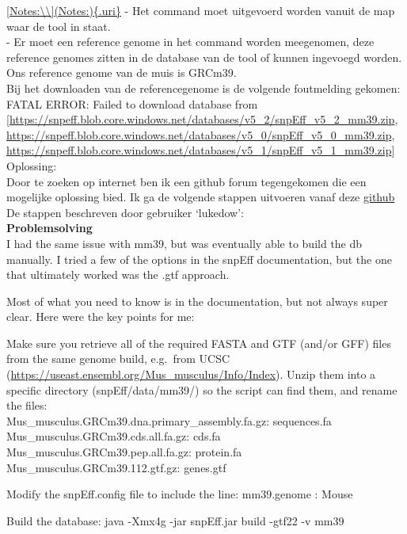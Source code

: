 \documentclass[
]{article}
\begin{document}
\href{\%5BNotes:\%5D(Notes:)\%7B.uri\%7D}{{[}Notes:\textbackslash\textbackslash{]}(Notes:)\{.uri\}}
- Het command moet uitgevoerd worden vanuit de map waar de tool in
staat.\\
- Er moet een reference genome in het command worden meegenomen, deze
reference genomes zitten in de database van de tool of kunnen ingevoegd
worden. Ons reference genome van de muis is GRCm39.\\

Bij het downloaden van de referencegenome is de volgende foutmelding
gekomen:\\
FATAL ERROR: Failed to download database from
{[}\url{https://snpeff.blob.core.windows.net/databases/v5_2/snpEff_v5_2_mm39.zip},
\url{https://snpeff.blob.core.windows.net/databases/v5_0/snpEff_v5_0_mm39.zip},
\url{https://snpeff.blob.core.windows.net/databases/v5_1/snpEff_v5_1_mm39.zip}{]}\\

Oplossing:\\
Door te zoeken op internet ben ik een github forum tegengekomen die een
mogelijke oplossing bied. Ik ga de volgende stappen uitvoeren vanaf deze
\href{https://github.com/pcingola/SnpEff/issues/536}{github}\\
De stappen beschreven door gebruiker `lukedow':\\

\textbf{Problemsolving}\\
I had the same issue with mm39, but was eventually able to build the db
manually. I tried a few of the options in the snpEff documentation, but
the one that ultimately worked was the .gtf approach.

Most of what you need to know is in the documentation, but not always
super clear. Here were the key points for me:

Make sure you retrieve all of the required FASTA and GTF (and/or GFF)
files from the same genome build, e.g.~from UCSC
(\url{https://useast.ensembl.org/Mus_musculus/Info/Index}). Unzip them
into a specific directory (snpEff/data/mm39/) so the script can find
them, and rename the files:\\
Mus\_musculus.GRCm39.dna.primary\_assembly.fa.gz: sequences.fa
Mus\_musculus.GRCm39.cds.all.fa.gz: cds.fa
Mus\_musculus.GRCm39.pep.all.fa.gz: protein.fa
Mus\_musculus.GRCm39.112.gtf.gz: genes.gtf

Modify the snpEff.config file to include the line: mm39.genome : Mouse

Build the database: java -Xmx4g -jar snpEff.jar build -gtf22 -v mm39
\end{document}
